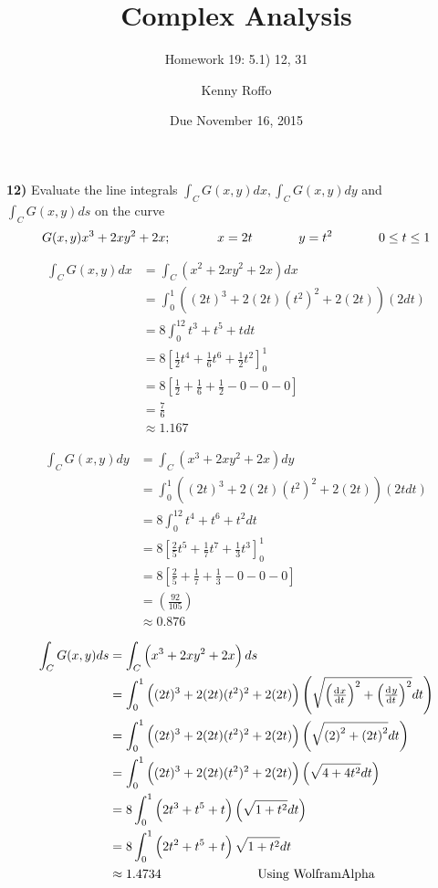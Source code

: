 \documentclass{scrartcl}
\title{Complex Analysis}
\subtitle{Homework 19: 5.1) 12, 31}
\author{Kenny Roffo}
\date{Due November 16, 2015}
\begin{document}
\maketitle

\textbf{12)} Evaluate the line integrals $\int_CG(x,y)dx, \int_CG(x,y)dy$ and $\int_CG(x,y)ds$ on the curve 
$$G(x,y)x^3+2xy^2+2x; \text{\hspace{0.5in}} x=2t \text{\hspace{0.5in}} y=t^2 \text{\hspace{0.5in}} 0\le t\le1$$

\begin{align*}
  \int_CG(x,y)dx &= \int_C\left(x^2+2xy^2+2x\right)dx\\
  &= \int_0^1\left((2t)^3+2(2t)(t^2)^2+2(2t)\right)(2dt)\\
  &= 8\int_0^12t^3+t^5+tdt\\
  &= 8\left[\frac{1}{2}t^4+\frac{1}{6}t^6+\frac{1}{2}t^2\right]_0^1\\
  &= 8\left[\frac{1}{2} + \frac{1}{6} + \frac{1}{2} - 0 - 0 - 0\right]\\
  &= \frac{7}{6}\\
  &\approx 1.167
\end{align*}

\begin{align*}
  \int_CG(x,y)dy &= \int_C\left(x^3+2xy^2+2x\right)dy\\
  &= \int_0^1\left((2t)^3+2(2t)(t^2)^2+2(2t)\right)(2tdt)\\
  &= 8\int_0^12t^4+t^6+t^2dt\\
  &= 8\left[\frac{2}{5}t^5+\frac{1}{7}t^7+\frac{1}{3}t^3\right]_0^1\\
  &= 8\left[\frac{2}{5} + \frac{1}{7} + \frac{1}{3} - 0 - 0 - 0\right]\\
  &= (\frac{92}{105})\\
  &\approx 0.876
\end{align*}

\begin{align*}
  \int_CG(x,y)ds &= \int_C\left(x^3+2xy^2+2x\right)ds\\
  &= \int_0^1\left((2t)^3+2(2t)(t^2)^2+2(2t)\right)\left(\sqrt{\left(\od{x}{t}\right)^2 + \left(\od{y}{t}\right)^2}dt\right)\\
  &= \int_0^1\left((2t)^3+2(2t)(t^2)^2+2(2t)\right)\left(\sqrt{\left(2\right)^2 + \left(2t\right)^2}dt\right)\\
  &= \int_0^1\left((2t)^3+2(2t)(t^2)^2+2(2t)\right)\left(\sqrt{4 + 4t^2}dt\right)\\
  &= 8\int_0^1\left(2t^3+t^5+t\right)\left(\sqrt{1 + t^2}dt\right)\\
  &= 8\int_0^1\left(2t^2+t^5+t\right)\sqrt{1 + t^2}dt\\
  &\approx 1.4734 \text{\hspace{1in} Using WolframAlpha}
\end{align*}\pagebreak
\end{document}
